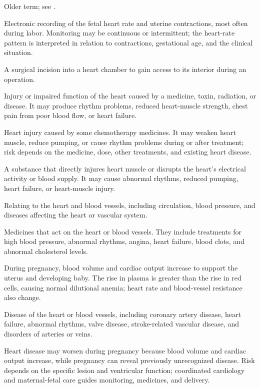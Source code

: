  Older term; see .

 Electronic recording of the fetal heart rate and uterine contractions, most often during labor. Monitoring may be continuous or intermittent; the heart-rate pattern is interpreted in relation to contractions, gestational age, and the clinical situation.

 A surgical incision into a heart chamber to gain access to its interior during an operation.

 Injury or impaired function of the heart caused by a medicine, toxin, radiation, or disease. It may produce rhythm problems, reduced heart-muscle strength, chest pain from poor blood flow, or heart failure.

 Heart injury caused by some chemotherapy medicines. It may weaken heart muscle, reduce pumping, or cause rhythm problems during or after treatment; risk depends on the medicine, dose, other treatments, and existing heart disease.

 A substance that directly injures heart muscle or disrupts the heart's electrical activity or blood supply. It may cause abnormal rhythms, reduced pumping, heart failure, or heart-muscle injury.

 Relating to the heart and blood vessels, including circulation, blood pressure, and diseases affecting the heart or vascular system.

 Medicines that act on the heart or blood vessels. They include treatments for high blood pressure, abnormal rhythms, angina, heart failure, blood clots, and abnormal cholesterol levels.

 During pregnancy, blood volume and cardiac output increase to support the uterus and developing baby. The rise in plasma is greater than the rise in red cells, causing normal dilutional anemia; heart rate and blood-vessel resistance also change.

 Disease of the heart or blood vessels, including coronary artery disease, heart failure, abnormal rhythms, valve disease, stroke-related vascular disease, and disorders of arteries or veins.

 Heart disease may worsen during pregnancy because blood volume and cardiac output increase, while pregnancy can reveal previously unrecognized disease. Risk depends on the specific lesion and ventricular function; coordinated cardiology and maternal-fetal care guides monitoring, medicines, and delivery.

